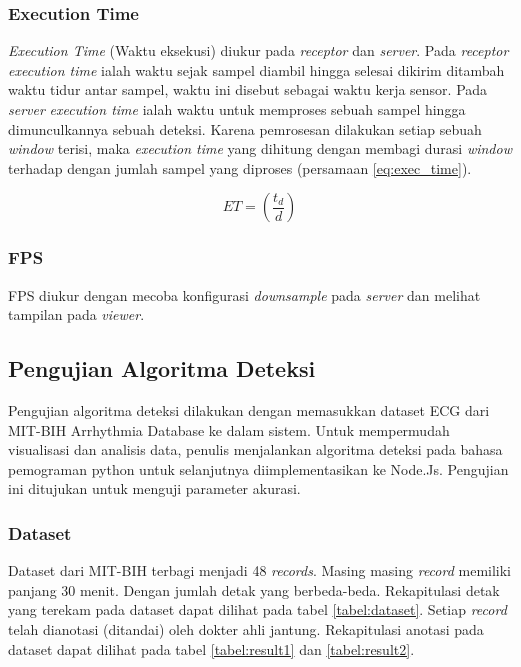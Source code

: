 \subsubsection{Execution Time}
\textit{Execution Time} (Waktu eksekusi) diukur pada \textit{receptor} dan \textit{server}. Pada \textit{receptor} \textit{execution time} ialah waktu sejak sampel diambil hingga selesai dikirim ditambah waktu tidur antar sampel, waktu ini disebut sebagai waktu kerja sensor. Pada \textit{server} \textit{execution time} ialah waktu untuk memproses sebuah sampel hingga dimunculkannya sebuah deteksi. Karena pemrosesan dilakukan setiap sebuah \textit{window} terisi, maka \textit{execution time} yang dihitung dengan membagi durasi \textit{window} terhadap dengan jumlah sampel yang diproses (persamaan \ref{eq:exec_time}).

\begin{equation}
ET = (\frac{t_d}{d})
\label{eq:exec_time} 
\end{equation}

\subsubsection{FPS}
FPS diukur dengan mecoba konfigurasi \textit{downsample} pada \textit{server} dan melihat tampilan pada \textit{viewer}.

\subsection{Pengujian Algoritma Deteksi}
Pengujian algoritma deteksi dilakukan dengan memasukkan dataset ECG dari MIT-BIH Arrhythmia Database \cite{mit_bih_paper}\cite{mit_bih_web} ke dalam sistem. Untuk mempermudah visualisasi dan analisis data, penulis menjalankan algoritma deteksi pada bahasa pemograman python untuk selanjutnya diimplementasikan ke Node.Js. Pengujian ini ditujukan untuk menguji parameter akurasi.

\subsubsection{Dataset}
Dataset dari MIT-BIH \cite{mit_bih_paper}\cite{mit_bih_web} terbagi menjadi 48 \textit{records}. Masing masing \textit{record} memiliki panjang 30 menit. Dengan jumlah detak yang berbeda-beda. Rekapitulasi detak yang terekam pada dataset dapat dilihat pada tabel \ref{tabel:dataset}. Setiap \textit{record} telah dianotasi (ditandai) oleh dokter ahli jantung\cite{mit_bih_web}. Rekapitulasi anotasi pada dataset dapat dilihat pada tabel \ref{tabel:result1}  dan \ref{tabel:result2}.

